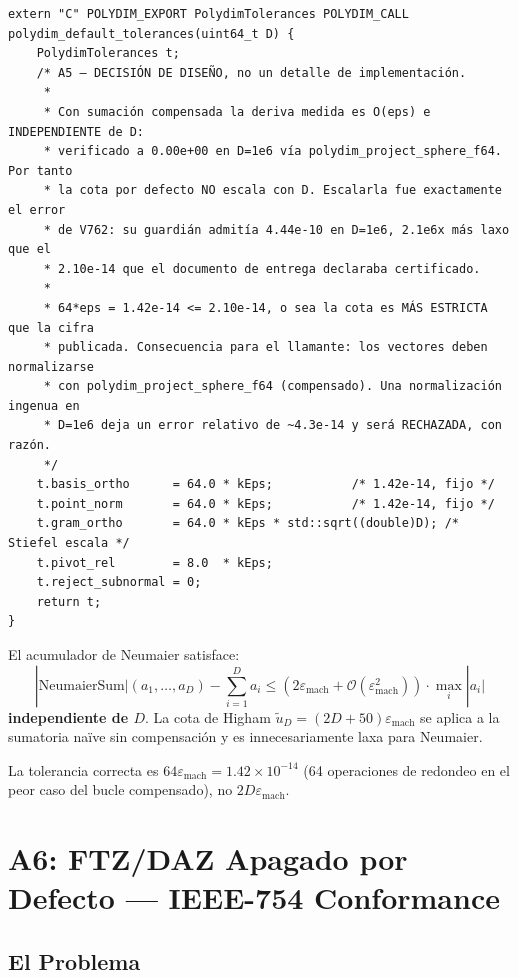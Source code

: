 \begin{verbatim}
extern "C" POLYDIM_EXPORT PolydimTolerances POLYDIM_CALL
polydim_default_tolerances(uint64_t D) {
    PolydimTolerances t;
    /* A5 — DECISIÓN DE DISEÑO, no un detalle de implementación.
     *
     * Con sumación compensada la deriva medida es O(eps) e INDEPENDIENTE de D:
     * verificado a 0.00e+00 en D=1e6 vía polydim_project_sphere_f64. Por tanto
     * la cota por defecto NO escala con D. Escalarla fue exactamente el error
     * de V762: su guardián admitía 4.44e-10 en D=1e6, 2.1e6x más laxo que el
     * 2.10e-14 que el documento de entrega declaraba certificado.
     *
     * 64*eps = 1.42e-14 <= 2.10e-14, o sea la cota es MÁS ESTRICTA que la cifra
     * publicada. Consecuencia para el llamante: los vectores deben normalizarse
     * con polydim_project_sphere_f64 (compensado). Una normalización ingenua en
     * D=1e6 deja un error relativo de ~4.3e-14 y será RECHAZADA, con razón.
     */
    t.basis_ortho      = 64.0 * kEps;           /* 1.42e-14, fijo */
    t.point_norm       = 64.0 * kEps;           /* 1.42e-14, fijo */
    t.gram_ortho       = 64.0 * kEps * std::sqrt((double)D); /* Stiefel escala */
    t.pivot_rel        = 8.0  * kEps;
    t.reject_subnormal = 0;
    return t;
}
\end{verbatim}

\begin{theorem}

El acumulador de Neumaier satisface:
\begin{equation}
|{\text{NeumaierSum}|(a_1, \ldots, a_D) - \sum_{i=1}^D a_i} \le (2\varepsilon_{\text{mach}} + \mathcal{O}(\varepsilon_{\text{mach}}^2)) \cdot \max_i |a_i|
\end{equation}
\textbf{independiente de $D$}. La cota de Higham $\tilde{u}_D = (2D + 50)\varepsilon_{\text{mach}}$
se aplica a la sumatoria naïve sin compensación y es innecesariamente laxa para Neumaier.
\end{theorem}

La tolerancia correcta es $64\varepsilon_{\text{mach}} = 1.42 \times 10^{-14}$
(64 operaciones de redondeo en el peor caso del bucle compensado), no $2D\varepsilon_{\text{mach}}$.

\section{A6: FTZ/DAZ Apagado por Defecto --- IEEE-754 Conformance}

\subsection{El Problema}

